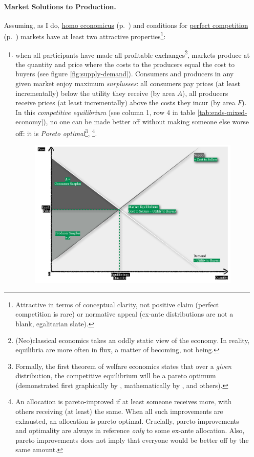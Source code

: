 \paragraph{Market Solutions to Production.}  \label{sec:market-solutions-production} Assuming, as I do, \hyperref[it:homoeconomicus]{homo economicus} (p.~\pageref{it:homoeconomicus})  and conditions for \hyperref[sec:perfect-competition]{perfect competition} (p.~\pageref{sec:perfect-competition}) markets have at least two attractive properties\footnote
	{Attractive in terms of conceptual clarity, not positive claim (perfect competition is rare) or normative appeal (ex-ante distributions are not a blank, egalitarian slate).}:
\begin{enumerate}
	\item when all  participants have made all profitable exchanges\footnote
		{(Neo)classical economics takes an oddly static view of the economy. In reality, equilibria are more often in flux, a matter of becoming, not being.}, 
	markets produce at the quantity and price where the costs to the producers equal the cost to buyers (see figure \ref{fig:supply-demand}). Consumers and producers in any given market enjoy maximum \emph{surplusses}: all consumers pay prices (at least incrementally) below the utility they receive (by area $A$), all producers receive prices (at least incrementally) above the costs they incur (by area $F$). In this \emph{competitive equilibrium} (see column 1, row 4 in table \ref{tab:ends-mixed-economy}), no one can be made better off without making someone else worse off: it is \emph{Pareto optimal}\footnote{
		\label{fn:1sttheorem} Formally, the first theorem of welfare economics states that over a \emph{given} distribution, the competitive equilibrium will be a pareto optimum (demonstrated first graphically by \cite{Lerner1944}, mathematically by \cite{Lange1934}, \cite{Debreu1954} and others).},
		\footnote{An allocation is pareto-improved if at least someone receives more, with others receiving (at least) the same. When all such improvements are exhausted, an allocation is pareto optimal. Crucially, pareto improvements and optimality are always in reference \emph{only} to some ex-ante allocation. Also, pareto improvements does not imply that everyone would be better off by the same amount.}. 
	\begin{figure}[htbp]
		\centering
		\includegraphics[width=1\textwidth]{./img/supply-demand}  

\end{figure}
\end{enumerate}
